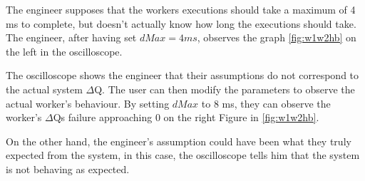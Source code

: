         The engineer supposes that the workers executions should take a maximum of 4 ms to complete, but doesn't actually know how long the executions should take. The engineer, after having set $dMax = 4ms$, observes the graph \cref{fig:w1w2hb} on the left in the oscilloscope.

    The oscilloscope shows the engineer that their assumptions do not correspond to the actual system $\Delta$Q. The user can then modify the parameters to observe the actual worker's behaviour. By setting $dMax$ to 8 ms, they can observe the worker's $\Delta$Qs failure approaching $0$ on the right Figure in \cref{fig:w1w2hb}.

    On the other hand, the engineer's assumption could have been what they truly expected from the system, in this case, the oscilloscope tells him that the system is not behaving as expected. 

